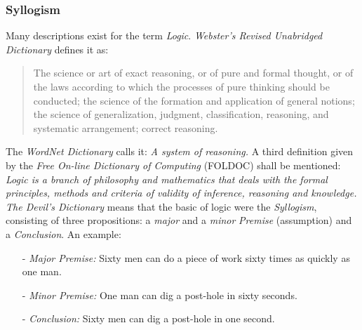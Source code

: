 %
%
%
%
%
%
%

\subsubsection{Syllogism}
\label{syllogism_heading}

Many descriptions exist for the term \emph{Logic}. \emph{Webster's Revised
Unabridged Dictionary} \cite{websters} defines it as:

\begin{quote}
    The science or art of exact reasoning, or of pure and formal thought, or of
    the laws according to which the processes of pure thinking should be conducted;
    the science of the formation and application of general notions; the science
    of generalization, judgment, classification, reasoning, and systematic
    arrangement; correct reasoning.
\end{quote}

The \emph{WordNet Dictionary} \cite{wordnet} calls it: \textit{A system of
reasoning.} A third definition given by the
\emph{Free On-line Dictionary of Computing} (FOLDOC) \cite{foldoc} shall be
mentioned: \textit{Logic is a branch of philosophy and mathematics that deals
with the formal principles, methods and criteria of validity of inference,
reasoning and knowledge.} \emph{The Devil's Dictionary} \cite{devils} means
that the basic of logic were the \emph{Syllogism}, consisting of three
propositions: a \emph{major} and a \emph{minor} \emph{Premise} (assumption) and
a \emph{Conclusion}. An example:

\begin{itemize}
    \item[-] \emph{Major Premise:} Sixty men can do a piece of work sixty times
        as quickly as one man.
    \item[-] \emph{Minor Premise:} One man can dig a post-hole in sixty seconds.
    \item[-] \emph{Conclusion:} Sixty men can dig a post-hole in one second.
\end{itemize}

